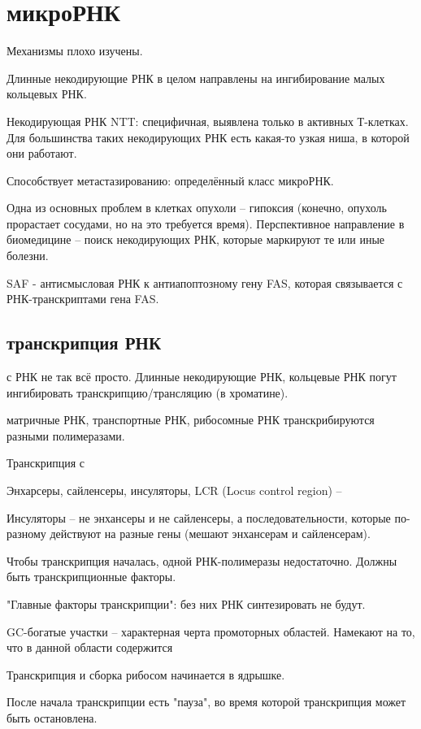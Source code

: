 \documentclass[main.tex]{subfiles}
\begin{document}
	
\section{микроРНК}

Механизмы плохо изучены.

Длинные некодирующие РНК в целом направлены на ингибирование малых кольцевых РНК.

Некодирующая РНК NTT: специфичная, выявлена только в активных Т-клетках.
Для большинства таких некодирующих РНК есть какая-то узкая ниша, в которой они работают.

Способствует метастазированию: определённый класс микроРНК.

Одна из основных проблем в клетках опухоли -- гипоксия (конечно, опухоль прорастает сосудами, но на это требуется время).
Перспективное направление в биомедицине -- поиск некодирующих РНК, которые маркируют те или иные болезни.

SAF -  антисмысловая РНК к антиапоптозному гену FAS, которая связывается с РНК-транскриптами гена FAS.

\subsection{транскрипция РНК}

с РНК не так всё просто.
Длинные некодирующие РНК, кольцевые РНК погут ингибировать транскрипцию/трансляцию (в хроматине).

матричные РНК, транспортные РНК, рибосомные РНК транскрибируются разными полимеразами.

Транскрипция с

Энхарсеры, сайленсеры, инсуляторы, LCR (Locus control region) --

Инсуляторы -- не энхансеры и не сайленсеры, а последовательности, которые по-разному действуют на разные гены (мешают энхансерам и сайленсерам).

Чтобы транскрипция началась, одной РНК-полимеразы недостаточно.
Должны быть транскрипционные факторы.

"Главные факторы транскрипции": без них РНК синтезировать не будут.
\begin{leftbar}
	GC-богатые участки -- характерная черта промоторных областей.
	Намекают на то, что в данной области содержится 
\end{leftbar}

Транскрипция и сборка рибосом начинается в ядрышке.

После начала транскрипции есть "пауза", во время которой транскрипция может быть остановлена.
\end{document}
